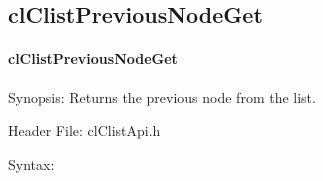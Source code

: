 \begin{flushleft}
\subsection{clClistPreviousNodeGet}
\hypertarget{pagecl110}{}\paragraph{cl\-Clist\-Previous\-Node\-Get}\label{pagecl110}
\begin{Desc}
\item[Synopsis:]Returns the previous node from the list.\end{Desc}
\begin{Desc}
\item[Header File:]clClistApi.h\end{Desc}
\begin{Desc}
\item[Syntax:]


\end{Desc}
\end{flushleft}
